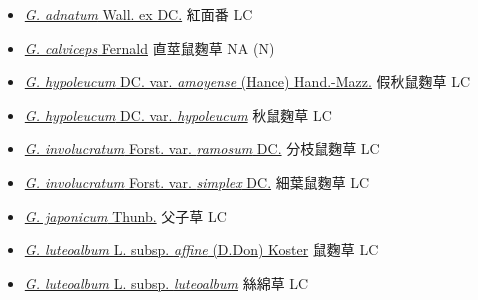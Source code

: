 \begin{itemize}
  \begin{itemize}
        \item[] \href{http://www.theplantlist.org/tpl1.1/search?q=Gnaphalium+adnatum}{\textit{G. adnatum} Wall. ex DC.}   紅面番   LC
        \item[] \href{http://www.theplantlist.org/tpl1.1/search?q=Gnaphalium+calviceps}{\textit{G. calviceps} Fernald}   直莖鼠麴草   NA (N)
        \item[] \href{http://www.theplantlist.org/tpl1.1/search?q=Gnaphalium+hypoleucum+var.+amoyense}{\textit{G. hypoleucum} DC. var. \textit{amoyense} (Hance) Hand.-Mazz.}   假秋鼠麴草   LC
        \item[] \href{http://www.theplantlist.org/tpl1.1/search?q=Gnaphalium+hypoleucum+var.+hypoleucum}{\textit{G. hypoleucum} DC. var. \textit{hypoleucum}}   秋鼠麴草   LC
        \item[] \href{http://www.theplantlist.org/tpl1.1/search?q=Gnaphalium+involucratum+var.+ramosum}{\textit{G. involucratum} Forst. var. \textit{ramosum} DC.}   分枝鼠麴草   LC
        \item[] \href{http://www.theplantlist.org/tpl1.1/search?q=Gnaphalium+involucratum+var.+simplex}{\textit{G. involucratum} Forst. var. \textit{simplex} DC.}   細葉鼠麴草   LC
        \item[] \href{http://www.theplantlist.org/tpl1.1/search?q=Gnaphalium+japonicum}{\textit{G. japonicum} Thunb.}   父子草   LC
        \item[] \href{http://www.theplantlist.org/tpl1.1/search?q=Gnaphalium+luteoalbum+subsp.+affine}{\textit{G. luteoalbum} L. subsp. \textit{affine} (D.Don) Koster}   鼠麴草   LC
        \item[] \href{http://www.theplantlist.org/tpl1.1/search?q=Gnaphalium+luteoalbum+subsp.+luteoalbum}{\textit{G. luteoalbum} L. subsp. \textit{luteoalbum}}   絲綿草   LC

\end{itemize}
\end{itemize}
